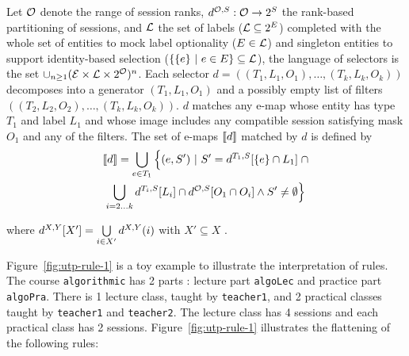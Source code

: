 Let
${\mathcal{O}}$
denote the range of session ranks,
${d^{\mathcal{O},S}}:\mathcal{O}\rightarrow2{^S}$
the rank-based partitioning of sessions,
and
${\mathcal{L}}$
the set of labels 
(${\mathcal{L}}\subseteq2^{{E}}$)
completed 
with the whole set of entities to mock label optionality
($E\in{\mathcal{L}}$)
and singleton entities to support identity-based selection
($\{\{e\}\ |\ e\in{E}\}\subseteq{\mathcal{L}}$),
the language of selectors
is the set 
$
\cup_{n\geq1}({\mathcal{E}}\times{\mathcal{L}}\times{2^{\mathcal{O}}})^{n}
$.
Each selector 
$
d=((T_1,L_1,O_1),\ldots,(T_k,L_k,O_k))
$
decomposes into a generator
$
(T_1,L_1,O_1)
$
and a possibly empty list of filters
$
((T_2,L_2,O_2),\ldots,(T_k,L_k,O_k))
$.
$d$ matches any e-map
whose entity has type $T_1$ and label $L_1$ and whose image includes any compatible session satisfying mask $O_1$ and any of the filters.
The set of e-maps
$\llbracket d\rrbracket$
matched by $d$
is defined by
\begin{multline*}
\denote{d}=
\bigcup\limits_{e\in{T_1}}
\Big \{(e,S')
\ |\ 
S'=
\mape{T_1}{\SESSION}{\myset{e}\cap L_1}
\;\cap \\
\bigcup\limits_{i=2\ldots k}
{
\mape{T_i}{\SESSION}{L_i}
\cap
\mape{\RANK}{\SESSION}{O_1\cap O_i}
\wedge
S'\neq\emptyset
}
\Big \}
\end{multline*}

where
$
{d^{X,Y}[X']}
=
\bigcup\limits_{i\in X'}{d^{X,Y}(i)}
$
with
$X'\subseteq X$
.

Figure~\ref{fig:utp-rule-1} is a toy example to illustrate the interpretation of rules.
The course \texttt{algorithmic} has 2 parts : lecture part \texttt{algoLec} and practice part \texttt{algoPra}.
There is 1 lecture class, taught by \texttt{teacher1}, and 2 practical classes taught by \texttt{teacher1} and \texttt{teacher2}.
The lecture class has 4 sessions and each practical class has 2 sessions.
Figure~\ref{fig:utp-rule-1} illustrates the flattening of the following rules: 

